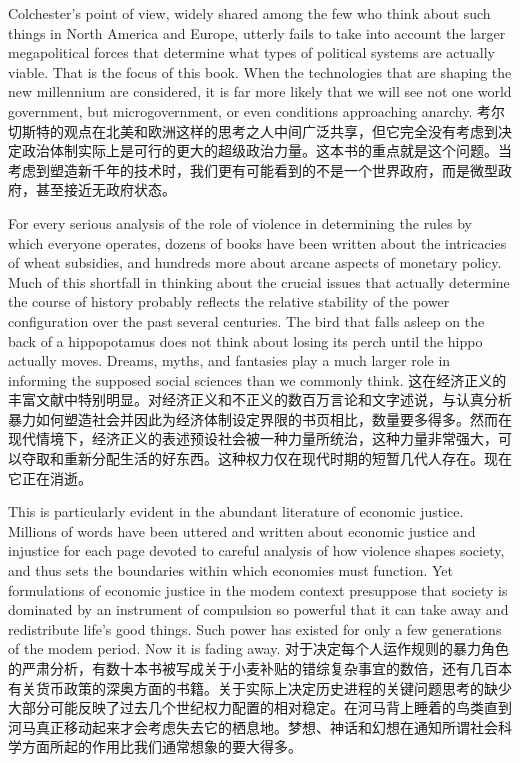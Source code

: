 \begin{Parallel}{97mm}{45mm}
  \ParallelLText
  {Colchester's point of view, widely shared among the few who think about such things in North America and Europe, utterly fails to take into account the larger megapolitical forces that determine what types of political systems are actually viable. That is the focus of this book. When the technologies that are shaping the new millennium are considered, it is far more likely that we will see not one world government, but microgovernment, or even conditions approaching anarchy.    }  
  \ParallelRText
  {\small 考尔切斯特的观点在北美和欧洲这样的思考之人中间广泛共享，但它完全没有考虑到决定政治体制实际上是可行的更大的超级政治力量。这本书的重点就是这个问题。当考虑到塑造新千年的技术时，我们更有可能看到的不是一个世界政府，而是微型政府，甚至接近无政府状态。}
  \ParallelPar


  \ParallelLText
  {For every serious analysis of the role of violence in determining the rules by which everyone operates, dozens of books have been written about the intricacies of wheat subsidies, and hundreds more about arcane aspects of monetary policy. Much of this shortfall in thinking about the crucial issues that actually determine the course of history probably reflects the relative stability of the power configuration over the past several centuries. The bird that falls asleep on the back of a hippopotamus does not think about losing its perch until the hippo actually moves. Dreams, myths, and fantasies play a much larger role in informing the supposed social sciences than we commonly think.  }  
  \ParallelRText
  {\small 这在经济正义的丰富文献中特别明显。对经济正义和不正义的数百万言论和文字述说，与认真分析暴力如何塑造社会并因此为经济体制设定界限的书页相比，数量要多得多。然而在现代情境下，经济正义的表述预设社会被一种力量所统治，这种力量非常强大，可以夺取和重新分配生活的好东西。这种权力仅在现代时期的短暂几代人存在。现在它正在消逝。}
  \ParallelPar

  \ParallelLText
  {This is particularly evident in the abundant literature of economic justice. Millions of words have been uttered and written about economic justice and injustice for each page devoted to careful analysis of how violence shapes society, and thus sets the boundaries within which economies must function. Yet formulations of economic justice in the modem context presuppose that society is dominated by an instrument of compulsion so powerful that it can take away and redistribute life's good things. Such power has existed for only a few generations of the modem period. Now it is fading away. }  
  \ParallelRText
  {\small 对于决定每个人运作规则的暴力角色的严肃分析，有数十本书被写成关于小麦补贴的错综复杂事宜的数倍，还有几百本有关货币政策的深奥方面的书籍。关于实际上决定历史进程的关键问题思考的缺少大部分可能反映了过去几个世纪权力配置的相对稳定。在河马背上睡着的鸟类直到河马真正移动起来才会考虑失去它的栖息地。梦想、神话和幻想在通知所谓社会科学方面所起的作用比我们通常想象的要大得多。}
  \ParallelPar


\end{Parallel}
